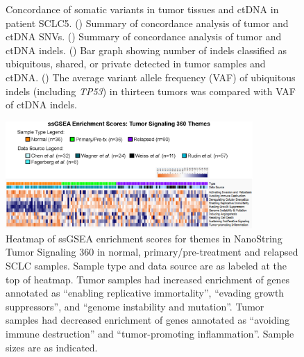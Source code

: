 \begin{figure}[p]
\begin{subfigure}{0.38\textwidth}
        \vspace{-0.1cm}
        \caption{}\label{fig:sclc:tissue_ctdna_ubiq_indel}
    \end{subfigure}%
    \hspace{0.1\textwidth}
    
    \caption[SNV and indel concordance in patient SCLC5 tumor tissue and ctDNA.]{Concordance of somatic variants in tumor tissues and ctDNA in patient SCLC5. () Summary of concordance analysis of tumor and ctDNA SNVs. () Summary of concordance analysis of tumor and ctDNA indels. () Bar graph showing number of indels classified as ubiquitous, shared, or private detected in tumor samples and ctDNA\@. () The average variant allele frequency (VAF) of ubiquitous indels (including \textit{TP53}) in thirteen tumors was compared with VAF of ctDNA indels.}
    \label{fig:sclc:tissue_ctdna_concordance_detail}
\end{figure}

\begin{figure}[htbp]
    \centering
    \includegraphics[width=0.84\textwidth,keepaspectratio]{images/sclc/ssgsea_heatmap}
    \caption[Heatmap of ssGSEA enrichment for 132 tissue samples.]{Heatmap of ssGSEA enrichment scores for themes in NanoString Tumor Signaling 360 in normal, primary/pre-treatment and relapsed SCLC samples. Sample type and data source are as labeled at the top of heatmap. Tumor samples had increased enrichment of genes annotated as ``enabling replicative immortality'', ``evading growth suppressors'', and ``genome instability and mutation''. Tumor samples had decreased enrichment of genes annotated as ``avoiding immune destruction'' and ``tumor-promoting inflammation''. Sample sizes are as indicated.}
    \label{fig:sclc:ssgsea_heatmap}
\end{figure}

